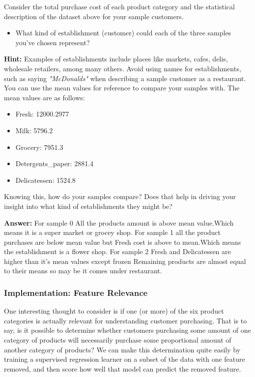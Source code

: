 \documentclass[11pt]{article}
\providecommand{\tightlist}{%
      \setlength{\itemsep}{0pt}\setlength{\parskip}{0pt}}
\begin{document}
Consider the total purchase cost of each product category and the
statistical description of the dataset above for your sample customers.

\begin{itemize}
\tightlist
\item
  What kind of establishment (customer) could each of the three samples
  you've chosen represent?
\end{itemize}

\textbf{Hint:} Examples of establishments include places like markets,
cafes, delis, wholesale retailers, among many others. Avoid using names
for establishments, such as saying \emph{"McDonalds"} when describing a
sample customer as a restaurant. You can use the mean values for
reference to compare your samples with. The mean values are as follows:

\begin{itemize}
\tightlist
\item
  Fresh: 12000.2977
\item
  Milk: 5796.2
\item
  Grocery: 7951.3
\item
  Detergents\_paper: 2881.4
\item
  Delicatessen: 1524.8
\end{itemize}

Knowing this, how do your samples compare? Does that help in driving
your insight into what kind of establishments they might be?

    \textbf{Answer:} For sample 0 All the products amount is above mean
value.Which means it is a super market or grocey shop. For sample 1 all
the product purchases are below mean value but Fresh cost is above to
mean.Which means the establishment is a flower shop. For sample 2 Fresh
and Delicatessen are higher than it's mean values except frozen
Remaining products are almost equal to their means so may be it comes
under restaurant.

    \subsubsection{Implementation: Feature
Relevance}\label{implementation-feature-relevance}

One interesting thought to consider is if one (or more) of the six
product categories is actually relevant for understanding customer
purchasing. That is to say, is it possible to determine whether
customers purchasing some amount of one category of products will
necessarily purchase some proportional amount of another category of
products? We can make this determination quite easily by training a
supervised regression learner on a subset of the data with one feature
removed, and then score how well that model can predict the removed
feature.
\end{document}
